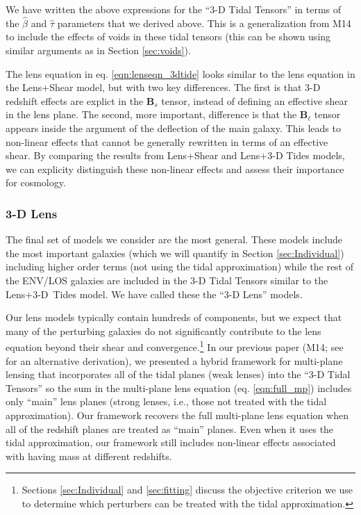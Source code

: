 \documentclass{emulateapj}
\newcommand\B[0]{\mathbf{B}}
\newcommand\betahat{\hat{\beta}}
\newcommand\tauhat{\hat{\tau}}
\begin{document}
We have written the above expressions for the ``3-D Tidal Tensors'' in terms of the $\betahat$ and $\tauhat$ parameters that we derived above. This is a generalization from M14 to include the effects of voids in these tidal tensors (this can be shown using similar arguments as in Section \ref{sec:voids}).

The lens equation in eq. \ref{eqn:lenseqn_3dtide} looks similar to the lens equation in the Lens+Shear model, but with two key differences. The first is that 3-D redshift effects are explict in the $\B_s$ tensor, instead of defining an effective shear in the lens plane. The second, more important, difference is that the $\B_\ell$ tensor appears inside the argument of the deflection of the main galaxy. This leads to non-linear effects that cannot be generally rewritten in terms of an effective shear. By comparing the results from Lens+Shear and Lens+3-D Tides models, we can explicity distinguish these non-linear effects and assess their importance for cosmology. 

\subsubsection{3-D Lens}
The final set of models we consider are the most general. These models include the most important galaxies (which we will quantify in Section \ref{sec:Individual}) including higher order terms (not using the tidal approximation) while the rest of the ENV/LOS galaxies are included in the 3-D Tidal Tensors similar to the Lens+3-D~Tides model. We have called these the ``3-D Lens'' models. 

 Our lens models typically contain hundreds of components, but we expect that many of the perturbing galaxies do not significantly contribute to the lens equation beyond their shear and convergence.\footnote{Sections \ref{sec:Individual} and \ref{sec:fitting} discuss the objective criterion we use to determine which perturbers can be treated with the tidal approximation.}  In our previous paper (M14; see \citealt{Schneider14} for an alternative derivation), we presented a hybrid framework for multi-plane lensing that incorporates all of the tidal planes (weak lenses) into the ``3-D Tidal Tensors'' so the sum in the multi-plane lens equation (eq. \ref{eqn:full_mp}) includes only ``main'' lens planes (strong lenses, i.e., those not treated with the tidal approximation). Our framework recovers the full multi-plane lens equation when all of the redshift planes are treated as ``main'' planes. Even when it uses the tidal approximation, our framework still includes non-linear effects associated with having mass at different redshifts. 
 
\end{document}
